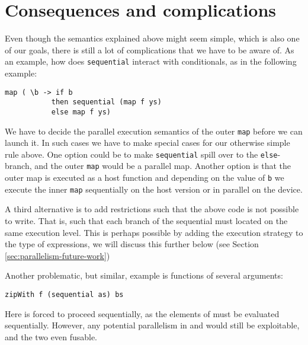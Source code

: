 \section{Consequences and complications}

Even though the semantics explained above might seem simple, which is
also one of our goals, there is still a lot of complications that we
have to be aware of. As an example, how does \lstinline{sequential}
interact with conditionals, as in the following example:
\begin{lstlisting}
map ( \b -> if b
           then sequential (map f ys)
           else map f ys)
\end{lstlisting}
We have to decide the parallel execution semantics of the outer
\lstinline{map} before we can launch it. In such cases we have to make
special cases for our otherwise simple rule above. One option could be
to make \lstinline{sequential} spill over to the
\lstinline{else}-branch, and the outer \lstinline{map} would be a
parallel map. Another option is that the outer map is executed as a
host function and depending on the value of \lstinline{b} we
execute the inner \lstinline{map} sequentially on the host version or
in parallel on the device.

A third alternative is to add restrictions such that the above code is
not possible to write. That is, such that each branch of the
sequential must located on the same execution level. This is perhaps
possible by adding the execution strategy to the type of expressions,
we will discuss this further below (see Section \ref{sec:parallelism-future-work})

Another problematic, but similar, example is functions of several arguments:
\begin{lstlisting}
zipWith f (sequential as) bs
\end{lstlisting}

Here  is forced to proceed sequentially, as the elements of
 must be evaluated sequentially. However, any potential
parallelism in  and  would still be exploitable,
and the two even fusable.

